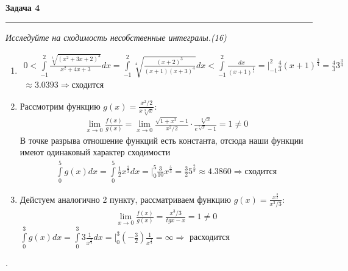 \documentclass[a4paper,11pt]{article}
\begin{document}
\textbf{\large Задача 4}
\medskip\hrule\medskip
\textit{Исследуйте на сходимость несобственные интегралы.(16)}
\begin{enumerate}
	\item 
	\begin{gather*}
	0 < \int\limits_{-1}^{2} \frac{\sqrt[4]{(x^2 + 3x + 2)^3}}{x^2 + 4x + 3}dx = 
	\int\limits_{-1}^{2} \sqrt[4]{\frac{(x + 2)^3}{(x + 1)(x + 3)^4}}dx < 
	\int\limits_{-1}^{2} \frac{dx}{(x + 1)^{\frac14}} = 
	\Big|_{-1}^{2} \frac43 (x + 1)^{\frac34} = \frac43 3^{\frac34} \\[2pt] \approx 3.0393 \Rightarrow \text{сходится}
	\end{gather*}
	
	\item Рассмотрим функцию $ g(x) =  \frac{x^2 / 2}{x\sqrt[3]{x}}:$
	\begin{gather*}
	\lim\limits_{x \to 0} \frac{f(x)}{g(x)} = 
	\lim\limits_{x \to 0} \frac{\sqrt{1 + x^2} - 1}{x^2/2} \cdot \frac{\sqrt[3]{x}}{e^{\sqrt[3]{x}} - 1} = 1 \neq 0 
	\end{gather*}
	В точке разрыва отношение функций есть константа, отсюда наши функции имеют одинаковый характер сходимости
	\begin{gather*}
	\int\limits_{0}^{5} g(x)dx =
	\int\limits_{0}^{5} \frac12 x^{\frac23}dx = 
	\Big|_{0}^{5} \frac3{10} x^{\frac53} = \frac3{2} 5^{\frac23} \approx 4.3860  \Rightarrow 
	\text{сходится}
	\end{gather*}
	
	\item Дейстуем аналогично 2 пункту, рассматриваем функцию $ g(x) =  \frac{x^{\frac32}}{x^3/3} $:
	\begin{gather*}
	\lim\limits_{x \to 0} \frac{f(x)}{g(x)} =
	\frac{x^3/3}{tg x - x} = 1 \neq 0
	\end{gather*}
	$ \int\limits_{0}^{3} g(x)dx =
	\int\limits_{0}^{3} 3 \frac1{x^{\frac32}}dx = 
	\Big|_{0}^{3} (-\frac32) \frac1{x^{\frac12}} = \infty \Rightarrow 
	$ расходится
\end{enumerate}
.
\\ \\ \\
\end{document}

